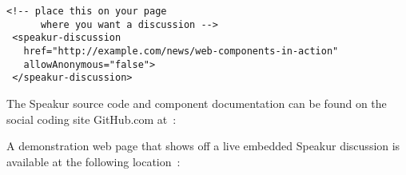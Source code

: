 \begin{lstlisting}[language=HTML5,caption={Speakur custom HTML element},label=l:example1]
 <!-- place this on your page
      where you want a discussion -->
 <speakur-discussion
   href="http://example.com/news/web-components-in-action"
   allowAnonymous="false">
 </speakur-discussion>
\end{lstlisting}

The Speakur source code and component documentation can be found on the social coding site GitHub.com at~\cite{landers2015-b}:


A demonstration web page that shows off a live embedded Speakur discussion is available at the following location~\cite{landers2015-c}:

